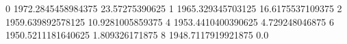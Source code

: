 0 1972.2845458984375 23.57275390625
1 1965.329345703125 16.6175537109375
2 1959.639892578125 10.9281005859375
4 1953.4410400390625 4.729248046875
6 1950.5211181640625 1.809326171875
8 1948.7117919921875 0.0
